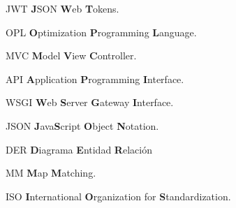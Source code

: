 \begin{abbreviations}
    \item[JWT] \textbf{J}SON \textbf{W}eb \textbf{T}okens.
    \item[OPL] \textbf{O}ptimization \textbf{P}rogramming \textbf{L}anguage.
    \item[MVC] \textbf{M}odel \textbf{V}iew \textbf{C}ontroller.
    \item[API] \textbf{A}pplication \textbf{P}rogramming \textbf{I}nterface.
    \item[WSGI] \textbf{W}eb \textbf{S}erver \textbf{G}ateway \textbf{I}nterface.
    \item[JSON] \textbf{J}ava\textbf{S}cript \textbf{O}bject \textbf{N}otation. 
    \item[DER] \textbf{D}iagrama \textbf{E}ntidad \textbf{R}elación
    
    \item[MM] \textbf{M}ap \textbf{M}atching.
    \item[ISO] \textbf{I}nternational \textbf{O}rganization for \textbf{S}tandardization.
    
\end{abbreviations}